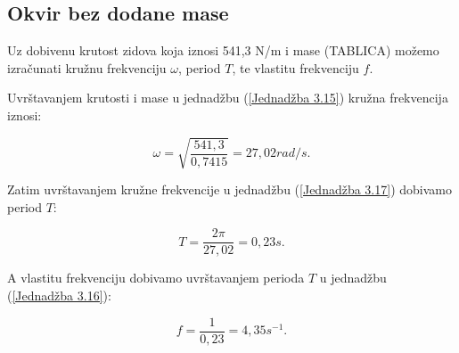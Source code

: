 \documentclass[12pt]{book}
\begin{document}
\subsection{Okvir bez dodane mase}

Uz dobivenu krutost zidova koja iznosi 541,3 N/m i mase (TABLICA) možemo izračunati kružnu frekvenciju $\omega$, period $T$, te vlastitu frekvenciju $f$.

Uvrštavanjem krutosti i mase u jednadžbu (\ref{Jednadžba 3.15}) kružna frekvencija iznosi:

\begin{equation}
	\omega = \sqrt{\frac{541,3}{0,7415}} = 27,02 rad/s.
\end{equation}

Zatim uvrštavanjem kružne frekvencije u jednadžbu (\ref{Jednadžba 3.17}) dobivamo period $T$:

\begin{equation}
	T = \frac{2\pi}{27,02} = 0,23 s.
\end{equation}

A vlastitu frekvenciju dobivamo uvrštavanjem perioda $T$ u jednadžbu (\ref{Jednadžba 3.16}):

\begin{equation}
	f = \frac{1}{0,23} = 4,35 s^{-1}.
\end{equation}
\cite{oluic2015}







\cleardoublepage{}

\vspace{\baselineskip}
\renewcommand{\bibname}{\uppercase{Literatura}}

%


\end{document}
